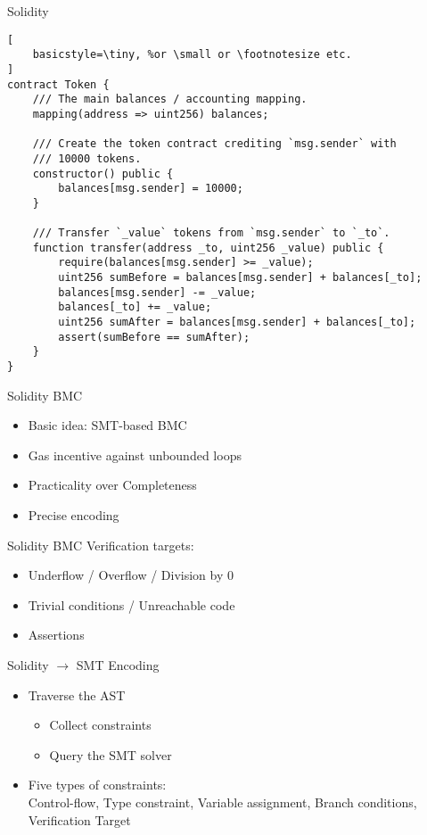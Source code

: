 \documentclass{beamer}
\begin{document}
\begin{frame}[fragile]{Solidity}
\begin{lstlisting}[
    basicstyle=\tiny, %or \small or \footnotesize etc.
]
contract Token {
    /// The main balances / accounting mapping.
    mapping(address => uint256) balances;

    /// Create the token contract crediting `msg.sender` with
    /// 10000 tokens.
    constructor() public {
        balances[msg.sender] = 10000;
    }

    /// Transfer `_value` tokens from `msg.sender` to `_to`.
    function transfer(address _to, uint256 _value) public {
        require(balances[msg.sender] >= _value);
        uint256 sumBefore = balances[msg.sender] + balances[_to];
        balances[msg.sender] -= _value;
        balances[_to] += _value;
        uint256 sumAfter = balances[msg.sender] + balances[_to];
        assert(sumBefore == sumAfter);
    }
}
\end{lstlisting}
\end{frame}

\begin{frame}{Solidity BMC}
\begin{itemize}
	\item Basic idea: SMT-based BMC \bigskip
	\item Gas incentive against unbounded loops \bigskip
	\item Practicality over Completeness \bigskip
	\item Precise encoding
\end{itemize}
\end{frame}

\begin{frame}{Solidity BMC}
Verification targets:\\
\begin{itemize}
	\item Underflow / Overflow / Division by 0 \bigskip
	\item Trivial conditions / Unreachable code \bigskip
	\item Assertions
\end{itemize}
\end{frame}

\begin{frame}{Solidity $\rightarrow$ SMT Encoding}
\begin{itemize}
	\item Traverse the AST
	\begin{itemize}
		\item Collect constraints
		\item Query the SMT solver \bigskip
	\end{itemize}
	\item Five types of constraints:\\Control-flow, Type constraint, Variable assignment, Branch conditions, Verification Target
\end{itemize}
\end{frame}
\end{document}
